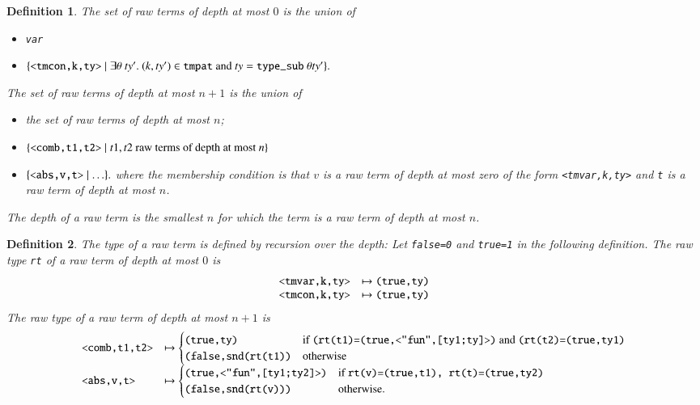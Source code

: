 \documentclass[cup9a]{cupbook}
\newtheorem{definition}{Definition}[chapter]
\begin{document}
\begin{definition} The set of raw terms of depth at most $0$ is
the union of
\begin{itemize}
\item \verb!var!
\item $\{\verb!<tmcon,k,ty>! \mid \exists\theta~ty'.~
  (k,ty')\in \verb!tmpat! \hbox{ and } ty = \verb!type_sub!~\theta ty'\}.$
\end{itemize}
The set of raw terms of depth at most $n+1$ is the union of
\begin{itemize}
\item the set of raw terms of depth at most $n$;
\item $\{\verb!<comb,t1,t2>!\mid t1,t2\hbox{ raw terms of depth at most } n\}$
\item $\{\verb!<abs,v,t>!\mid \ldots\}.$
where the membership condition is that $v$ is a raw term of depth at most zero of the form \verb!<tmvar,k,ty>! and \verb!t! is a raw term of depth at most $n$.
\end{itemize}
The depth of a raw term is the smallest $n$ for which the
term is a raw term of depth at most $n$.
\end{definition}



\begin{definition} The type of a raw term is defined by recursion over the depth: Let \verb!false=0! and \verb!true=1! in
the following definition.
The raw type \verb!rt! of a raw term of depth at most $0$ is
$$
\begin{array}{lll}
\verb!<tmvar,k,ty>!&\mapsto \verb!(true,ty)!\\
\verb!<tmcon,k,ty>!&\mapsto \verb!(true,ty)!
\end{array}
$$
The raw type of a raw term of depth at most $n+1$ is
$$
\begin{array}{lll}
\verb!<comb,t1,t2>!&\mapsto 
\begin{cases}
\verb!(true,ty)! &\hbox{if } \verb!(rt(t1)=(true,<"fun",[ty1;ty]>)! \hbox{ and } \verb!(rt(t2)=(true,ty1)!\\
\verb!(false,snd(rt(t1))! & \hbox{otherwise}
\end{cases}\\
\verb!<abs,v,t>!&\mapsto
 \begin{cases}
\verb!(true,<"fun",[ty1;ty2]>)!&\hbox{if } \verb!rt(v)=(true,t1), rt(t)=(true,ty2)!\\
\verb!(false,snd(rt(v)))!&\hbox{otherwise}.
\end{cases}
\end{array}
$$
\end{definition}
\end{document}
